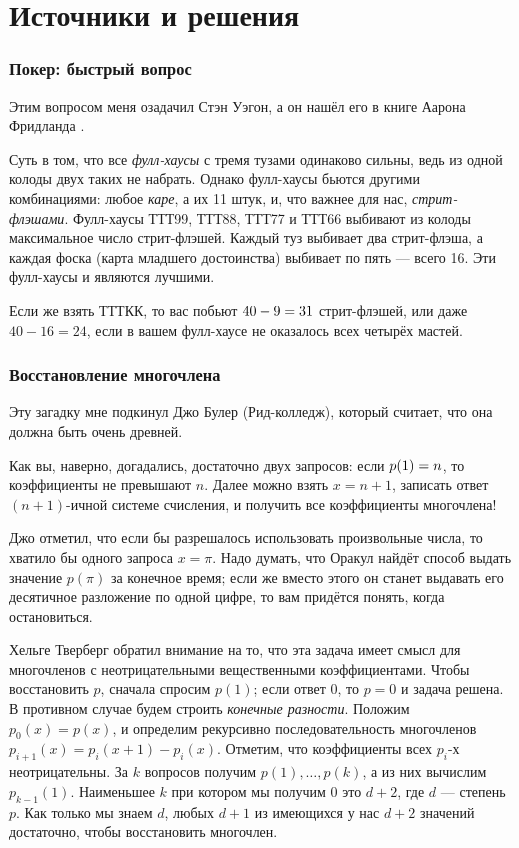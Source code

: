 \section*{Источники и решения}

\subsubsection*{Покер: быстрый вопрос}

Этим вопросом меня озадачил Стэн Уэгон, а он нашёл его в книге Аарона Фридланда \cite{18}.

Суть в том, что все \emph{фулл-хаусы} с тремя тузами одинаково сильны, ведь из одной колоды двух таких не набрать.
Однако фулл-хаусы бьются другими комбинациями: любое \emph{каре}, а их 11 штук, и, что важнее для нас, \emph{стрит-флэшами}.
Фулл-хаусы ТТТ99, ТТТ88, ТТТ77 и ТТТ66 выбивают из колоды максимальное число стрит-флэшей.
Каждый туз выбивает два стрит-флэша, а каждая фоска (карта младшего достоинства) выбивает по пять --- всего 16.
Эти фулл-хаусы и являются лучшими.

Если же взять ТТТКК, то вас побьют $40 - 9 \z= 31$ стрит-флэшей, или даже $40 - 16 = 24$, если в вашем фулл-хаусе не оказалось всех четырёх мастей.

\subsubsection*{Восстановление многочлена}

Эту загадку мне подкинул Джо Булер (Рид-колледж), который считает, что она должна быть очень древней.

Как вы, наверно, догадались, достаточно двух запросов:
если $p(1)\z=n$, то коэффициенты не превышают $n$.
Далее можно взять $x = n + 1$, записать ответ $(n + 1)$-ичной системе счисления, и получить все коэффициенты многочлена!

Джо отметил, что если бы разрешалось использовать произвольные числа, то хватило бы одного запроса $x = \pi$.
Надо думать, что Оракул найдёт способ выдать значение $p(\pi)$ за конечное время;
если же вместо этого он станет выдавать его десятичное разложение по одной цифре, то вам придётся понять, когда остановиться.

Хельге Тверберг обратил внимание на то, что эта задача имеет смысл для многочленов с неотрицательными вещественными коэффициентами.
Чтобы восстановить $p$, сначала спросим $p(1)$; если ответ $0$, то $p = 0$ и задача решена.
В противном случае будем строить \emph{конечные разности}.
Положим $p_0(x) = p(x)$, и определим рекурсивно последовательность многочленов $p_{i+1}(x) = p_i (x+1) - p_i(x)$.
Отметим, что коэффициенты всех $p_i$-х неотрицательны.
За $k$ вопросов получим $p(1),\dots,p(k)$,
а из них вычислим $p_{k-1}(1)$.
Наименьшее $k$ при котором мы получим $0$ это $d+2$, где $d$ --- степень $p$.
Как только мы знаем $d$, любых $d+1$ из имеющихся у нас $d+2$ значений достаточно, чтобы восстановить многочлен.

